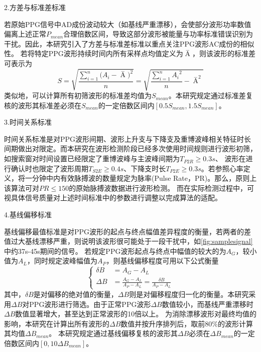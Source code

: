2.方差与标准差标准

若原始PPG信号中AD成份波动较大（如基线严重漂移），会使部分波形功率数值偏离上述正常$P_{mean}$合理倍数区间，导致这部分波形被能量与功率标准错误识别为干扰。因此，本研究引入了方差与标准差标准以重点关注PPG波形AC成份的相似性。
若将特定PPG波形持续时间内所有采样点均值定义为$\mathop{A} \limits^-$，则该波形的标准差可表示为
\begin{equation}
    \label{equ:ppgstd}
    S=\sqrt{\frac{\sum_{i=1}^{n}{(A_i-\mathop{A} \limits^-})^2}{n}}=\sqrt{\frac{\sum_{i=1}^n{A_i}^2}{n}-{\mathop{A} \limits^-}^2}
\end{equation}
类似地，可以计算所有初筛波形的标准差均值为$S_{mean}$。本研究规定通过标准差复核的波形其标准差必须在$S_{mean}$的一定倍数区间内$[0.5S_{mean},1.5S_{mean}]$。

3.时间关系标准

时间关系标准是对PPG波形间期、波形上升支与下降支及重博波峰相关特征时长间期做出对限定。而本研究在波形检测阶段已经多次使用时间规则进行波形初筛，如搜索窗对时间设置已经限定了重博波峰与主波峰间期为$T_{P2R}\ge0.3s$、
波形在进行确认时也限定了波形周期$T_{S2E}\ge 0.4s$、下降支时长$T_{P2E}\ge 0.3s$。若参照心率定义，将一分钟中内有效脉搏波的数量规定为脉率(Pulse Rate，PR)。那么，原则上该算法可对$PR \le 150$的原始脉搏波数据进行波形检测。
而在实际检测过程中，可视具体信号质量对上述时间标准中的参数进行调整以完成算法的适配。

4.基线偏移标准

基线偏移最值标准是对PPG波形的起点与终点幅值差异程度的衡量，若两者的差值过大基线漂移严重，则说明该波形很可能处于一段干扰中，如\autoref{fig:samplesignal}中约37s-45s期间的信号。
若规定PPG波形起点与终点中幅值的较大的为$A_G$，较小值为$A_L$，同时规定波峰幅值为$A_P$，则基线偏移程度可用以下公式衡量
\begin{equation}
    \label{equ:baselinestd}
    \left \{
    \begin{aligned}
        \delta B &=A_G-A_L \\
        \Delta B &=\frac{A_G-A_L}{A_P-A_L}=\frac{\delta B}{A_P-A_L}
    \end{aligned}
    \right.
\end{equation}
其中，$\delta B$是对偏移的绝对值的衡量，$\Delta B$则是对偏移程度归一化的衡量。本研究采用$\Delta B$对PPG波形进行筛选。由于正常PPG波形$\Delta B$数值较小，而基线严重漂移时$\Delta B$数值显著增大，甚至达到正常波形的10倍以上。
为消除漂移波形对最终均值的影响，本研究在计算出所有波形的$\Delta B$数值并按升序排列后，取前$80\%$的波形计算其均值${\Delta B}_{mean}$。
本研究规定通过基线偏移复核的波形其$\Delta B$必须在${\Delta B}_{mean}$的一定倍数区间内$[0,10{\Delta B}_{mean}]$。

